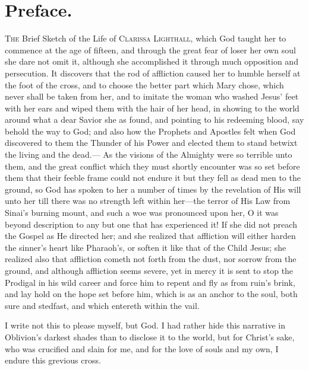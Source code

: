 \documentclass{article}
\begin{document}
\section*{Preface.}
\textsc{The} Brief Sketch of the Life of \textsc{Clarissa Lighthall}, which God taught her to commence at the age of fifteen, and through the great fear of loser her own soul she dare not omit it, although she accomplished it through much opposition and persecution.
It discovers that the rod of affliction caused her to humble herself at the foot of the cross, and to choose the better part which Mary chose, which never shall be taken from her, and to imitate the woman who washed Jesus' feet with her ears and wiped them with the hair of her head, in showing to the world around what a dear Savior she as found, and pointing to his redeeming blood, say behold the way to God; and also how the Prophets and Apostles felt when God discovered to them the Thunder of his Power and elected them to stand betwixt the living and the dead.---
As the visions of the Almighty were so terrible unto them, and the great conflict which they must shortly encounter was so set before them that their feeble frame could not endure it but they fell as dead men to the ground, so God has spoken to her a number of times by the revelation of His will unto her till there was no strength left within her---the terror of His Law from Sinai's burning mount, and such a woe was pronounced upon her, O it was beyond description to any but one that has experienced it!
If she did not preach the Gospel as He directed her; and she realized that affliction will either harden the sinner's heart like Pharaoh's, or soften it like that of the Child Jesus; she realized also that affliction cometh not forth from the dust, nor sorrow from the ground, and although affliction seems severe, yet in mercy it is sent to stop the Prodigal in his wild career and force him to repent and fly as from ruin's brink, and lay hold on the hope set before him, which is as an anchor to the soul, both sure and stedfast, and which entereth within the vail.

I write not this to please myself, but God.
I had rather hide this narrative in Oblivion's darkest shades than to disclose it to the world, but for Christ's sake, who was crucified and slain for me, and for the love of souls and my own, I endure this grevious cross.
\end{document}
